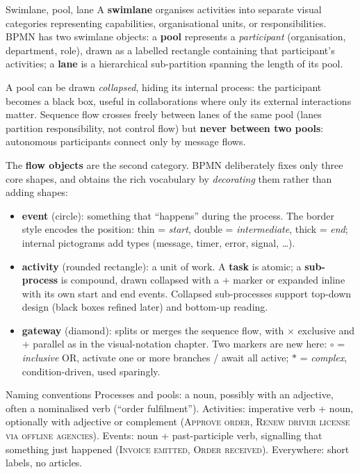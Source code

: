 \begin{definitionbox}{Swimlane, pool, lane}
A \textbf{swimlane} organises activities into separate visual categories representing capabilities, organisational units, or responsibilities. BPMN has two swimlane objects: a \textbf{pool} represents a \emph{participant} (organisation, department, role), drawn as a labelled rectangle containing that participant's activities; a \textbf{lane} is a hierarchical sub-partition spanning the length of its pool.
\end{definitionbox}

A pool can be drawn \emph{collapsed}, hiding its internal process: the participant becomes a black box, useful in collaborations where only its external interactions matter. Sequence flow crosses freely between lanes of the same pool (lanes partition responsibility, not control flow) but \textbf{never between two pools}: autonomous participants connect only by message flows.

The \textbf{flow objects} are the second category. BPMN deliberately fixes only three core shapes, and obtains the rich vocabulary by \emph{decorating} them rather than adding shapes:
\begin{itemize}
  \item \textbf{event} (circle): something that ``happens'' during the process. The border style encodes the position: thin = \emph{start}, double = \emph{intermediate}, thick = \emph{end}; internal pictograms add types (message, timer, error, signal, \dots).
  \item \textbf{activity} (rounded rectangle): a unit of work. A \textbf{task} is atomic; a \textbf{sub-process} is compound, drawn collapsed with a $+$ marker or expanded inline with its own start and end events. Collapsed sub-processes support top-down design (black boxes refined later) and bottom-up reading.
  \item \textbf{gateway} (diamond): splits or merges the sequence flow, with $\times$ exclusive and $+$ parallel as in the visual-notation chapter. Two markers are new here: $\circ$ = \emph{inclusive} OR, activate one or more branches / await all active; $\ast$ = \emph{complex}, condition-driven, used sparingly.
\end{itemize}

\begin{notebox}{Naming conventions}
Processes and pools: a noun, possibly with an adjective, often a nominalised verb (``order fulfilment''). Activities: imperative verb + noun, optionally with adjective or complement (\textsc{Approve order}, \textsc{Renew driver license via offline agencies}). Events: noun + past-participle verb, signalling that something just happened (\textsc{Invoice emitted}, \textsc{Order received}). Everywhere: short labels, no articles.
\end{notebox}


